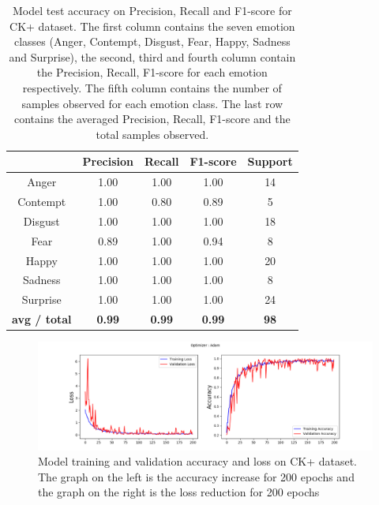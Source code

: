 \documentclass[master]{thesis-uestc}
\begin{document}
\begin{table}[ht]
\renewcommand{\arraystretch}{1.3}
\caption{Model test accuracy on Precision, Recall and F1-score for CK+ dataset. The first column contains the seven emotion classes (Anger, Contempt, Disgust, Fear, Happy, Sadness and Surprise), the second, third and fourth column contain the Precision, Recall, F1-score for each emotion respectively. The fifth column contains the number of samples observed for each emotion class. The last row contains the averaged Precision, Recall, F1-score and the total samples observed.}
\label{table_ck+_scores}
\begin{center}
\begin{tabular}{|c|c|c|c|c|}

\hline
 & Precision & Recall & F1-score & Support\\ \hline

Anger & 1.00 & 1.00 & 1.00 & 14\\ \hline
Contempt & 1.00 & 0.80 & 0.89 & 5\\ \hline
Disgust & 1.00 & 1.00 & 1.00 & 18\\ \hline
Fear & 0.89 & 1.00 & 0.94 & 8\\ \hline
Happy & 1.00 & 1.00 & 1.00 & 20\\ \hline
Sadness & 1.00 & 1.00 & 1.00 & 8\\ \hline
Surprise & 1.00 & 1.00 & 1.00 & 24\\ \hline

\textbf{avg / total} & \textbf{0.99} & \textbf{0.99} & \textbf{0.99} & \textbf{98}\\ \hline
\end{tabular}
\end{center}
\end{table}
\begin{figure}[ht]
\includegraphics[width=5in]{pic/XK+_accuracy_and_loss.png}
\caption{Model training and validation accuracy and loss on CK+ dataset. The graph on the left is the accuracy increase for 200 epochs and the graph on the right is the loss reduction for 200 epochs}
\label{ck+accuracy_loss}
\end{figure}
\end{document}

